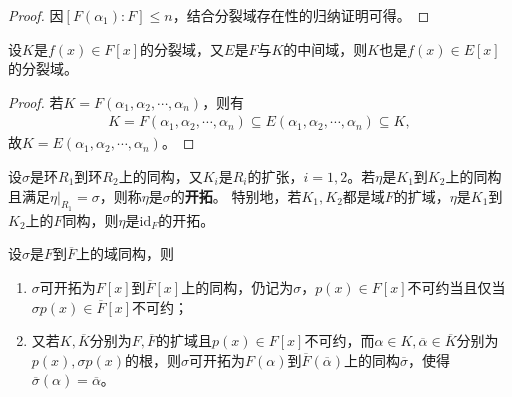 \documentclass[../../main.tex]{subfiles}%
\begin{document}
\begin{proof}

因$[F(\alpha_1):F]\leqslant n$，结合分裂域存在性的归纳证明可得。

\end{proof}

\begin{corollary}
设$K$是$f(x)\in F[x]$的分裂域，又$E$是$F$与$K$的中间域，则$K$也是$f(x)\in E[x]$的分裂域。
\end{corollary}

\begin{proof}

若$K=F(\alpha_1,\alpha_2,\cdots,\alpha_n)$，则有
\begin{align*}
K=F(\alpha_1,\alpha_2,\cdots,\alpha_n)\subseteq E(\alpha_1,\alpha_2,\cdots,\alpha_n)\subseteq K,
\end{align*}
故$K=E(\alpha_1,\alpha_2,\cdots,\alpha_n)$。

\end{proof}

\begin{definition}
设$\sigma$是环$R_1$到环$R_2$上的同构，又$K_i$是$R_i$的扩张，$i=1,2$。若$\eta$是$K_1$到$K_2$上的同构且满足$\eta|_{R_1}=\sigma$，则称$\eta$是$\sigma$的\textbf{开拓}。
特别地，若$K_1,K_2$都是域$F$的扩域，$\eta$是$K_1$到$K_2$上的$F$同构，则$\eta$是$\mathrm{id}_F$的开拓。
\end{definition}

\begin{theorem}
设$\sigma$是$F$到$\overline{F}$上的域同构，则
\begin{enumerate}[(1)]
\item $\sigma$可开拓为$F[x]$到$\overline{F}[x]$上的同构，仍记为$\sigma$，$p(x)\in F[x]$不可约当且仅当$\sigma p(x)\in\overline{F}[x]$不可约；
\item 又若$K,\overline{K}$分别为$F,\overline{F}$的扩域且$p(x)\in F[x]$不可约，而$\alpha\in K,\overline{\alpha}\in\overline{K}$分别为$p(x),\sigma p(x)$的根，则$\sigma$可开拓为$F(\alpha)$到$\overline{F}(\overline{\alpha})$上的同构$\overline{\sigma}$，使得$\overline{\sigma}(\alpha)=\overline{\alpha}$。
\end{enumerate}
\end{theorem}
\end{document}
